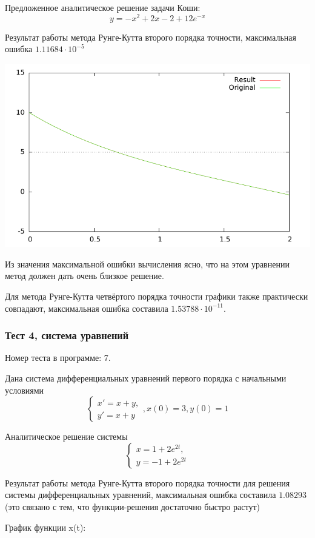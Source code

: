 \documentclass[a4paper,11pt]{report}
\begin{document}
Предложенное аналитическое решение задачи Коши:
$$
y = -x^2 + 2x - 2 + 12 e ^ {-x}
$$

Результат работы метода Рунге-Кутта второго порядка точности, максимальная ошибка $1.11684 \cdot 10^{-5}$

\includegraphics{../plots/test3_rk2.pdf}

Из значения максимальной ошибки вычисления ясно, что на этом уравнении метод должен дать очень
близкое решение.

Для метода Рунге-Кутта четвёртого порядка точности графики также практически совпадают, максимальная
ошибка составила $1.53788 \cdot 10^{-11}$.

\subsubsection{Тест 4, система уравнений}
Номер теста в программе: 7.

Дана система дифференциальных уравнений первого порядка с начальными условиями
$$
\begin{cases}
 x' = x + y, \\
 y' = x + y
\end{cases},
x(0) = 3, y(0) = 1
$$

Аналитическое решение системы
$$
\begin{cases}
 x = 1 + 2 e^{2t}, \\
 y = -1 + 2 e^{2t}
\end{cases}
$$

Результат работы метода Рунге-Кутта второго порядка точности для решения системы дифференциальных уравнений, максимальная
ошибка составила $1.08293$ (это связано с тем, что функции-решения достаточно быстро растут)

График функции x(t):
\end{document}
